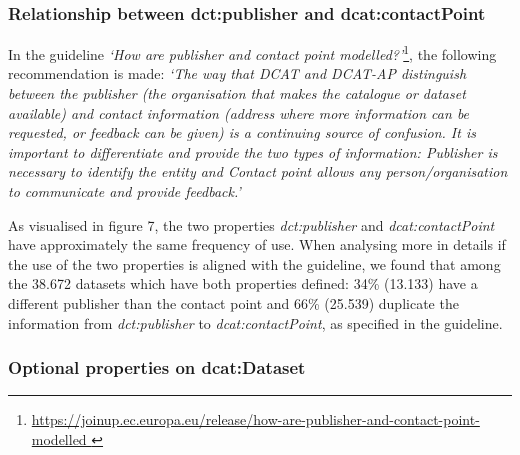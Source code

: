 \documentclass[<options>]{elsarticle}
\begin{document}
\subsubsection*{Relationship between dct:publisher and dcat:contactPoint}
In the guideline \textit{‘How are publisher and contact point modelled?’}\footnote{\href{ https://joinup.ec.europa.eu/release/how-are-publisher-and-contact-point-modelled }{ https://joinup.ec.europa.eu/release/how-are-publisher-and-contact-point-modelled }}, the following recommendation is made:
\textit{‘The way that DCAT and DCAT-AP distinguish between the publisher (the organisation that makes the catalogue or dataset available) and contact information (address where more information can be requested, or feedback can be given) is a continuing source of confusion. It is important to differentiate and provide the two types of information: Publisher is necessary to identify the entity and Contact point allows any person/organisation to communicate and provide feedback.’}

As visualised in figure 7, the two properties \textit{dct:publisher} and \textit{dcat:contactPoint} have approximately the same frequency of use. When analysing more in details if the use of the two properties is aligned with the guideline, we found that among the 38.672 datasets which have both properties defined: 34\% (13.133) have a different publisher than the contact point and 66\% (25.539) duplicate the information from \textit{dct:publisher} to \textit{dcat:contactPoint}, as specified in the guideline.

\subsubsection*{Optional properties on dcat:Dataset}
\end{document}
